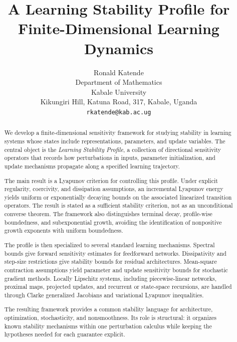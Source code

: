\documentclass{article}
\title{A Learning Stability Profile for Finite-Dimensional Learning Dynamics}
\author{Ronald Katende \\
Department of Mathematics\\
Kabale University\\
Kikungiri Hill, Katuna Road, 317, Kabale, Uganda\\
\texttt{rkatende@kab.ac.ug} %
}
\date{}
\numberwithin{equation}{section}
\begin{document}
\maketitle

\begin{abstract}
We develop a finite-dimensional sensitivity framework for studying stability in learning systems whose states include representations, parameters, and update variables. The central object is the \emph{Learning Stability Profile}, a collection of directional sensitivity operators that records how perturbations in inputs, parameter initialization, and update mechanisms propagate along a specified learning trajectory.

The main result is a Lyapunov criterion for controlling this profile. Under explicit regularity, coercivity, and dissipation assumptions, an incremental Lyapunov energy yields uniform or exponentially decaying bounds on the associated linearized transition operators. The result is stated as a sufficient stability criterion, not as an unconditional converse theorem. The framework also distinguishes terminal decay, profile-wise boundedness, and subexponential growth, avoiding the identification of nonpositive growth exponents with uniform boundedness.

The profile is then specialized to several standard learning mechanisms. Spectral bounds give forward sensitivity estimates for feedforward networks. Dissipativity and step-size restrictions give stability bounds for residual architectures. Mean-square contraction assumptions yield parameter and update sensitivity bounds for stochastic gradient methods. Locally Lipschitz systems, including piecewise-linear networks, proximal maps, projected updates, and recurrent or state-space recursions, are handled through Clarke generalized Jacobians and variational Lyapunov inequalities.

The resulting framework provides a common stability language for architecture, optimization, stochasticity, and nonsmoothness. Its role is structural: it organizes known stability mechanisms within one perturbation calculus while keeping the hypotheses needed for each guarantee explicit.
\end{abstract}


\end{document}
